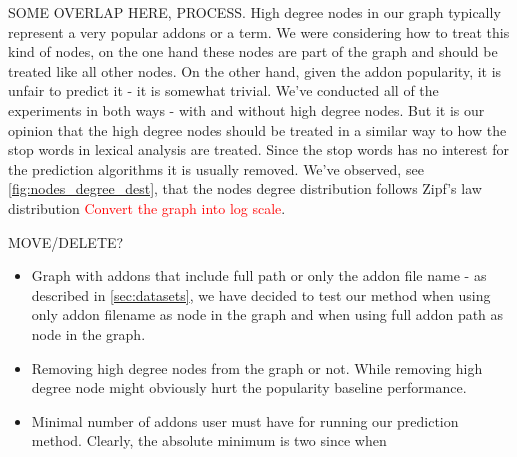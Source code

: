 \documentclass[11pt,oneside]{book}
\begin{document}
SOME OVERLAP HERE, PROCESS. High degree nodes in our graph typically represent a very popular
addons or a term. We were considering how to treat this kind of nodes,
on the one hand these nodes are part of the graph and should be
treated like all other nodes. On the other hand, given the addon
popularity, it is unfair to predict it - it is somewhat trivial. We've
conducted all of the experiments in both ways - with and without high
degree nodes. But it is our opinion that the high degree nodes should
be treated in a similar way to how the stop words in lexical analysis
are treated. Since the stop words has no interest for the prediction
algorithms it is usually removed. We've observed, see
\autoref{fig:nodes_degree_dest}, that the nodes degree distribution
follows Zipf's law distribution \textcolor{red}{Convert the graph into log scale}.


MOVE/DELETE?
\begin{itemize}
\renewcommand{\labelitemiii}{$\diamond$}
\item Graph with addons that include full path or only the addon file
  name - as described in \autoref{sec:datasets}, we have decided to
  test our method when using only addon filename as node in the graph
  and when using full addon path as node in the graph.
\item Removing high degree nodes from the graph or not. While removing
  high degree node might obviously hurt the popularity baseline
  performance.
\item Minimal number of addons user must have for running our
  prediction method. Clearly, the absolute minimum is two since when
\end{itemize}
\end{document}
